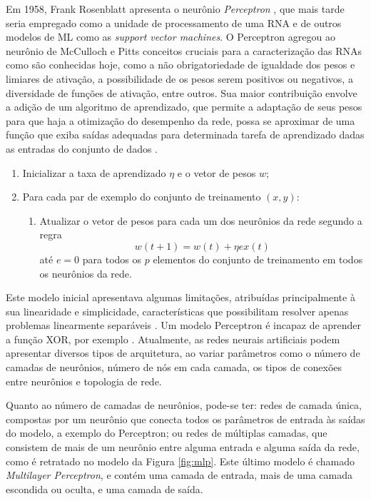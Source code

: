 Em 1958, Frank Rosenblatt apresenta o neurônio \emph{Perceptron} \cite{rosenblatt1958perceptron}, que mais tarde seria empregado como a unidade de processamento de uma RNA e de outros modelos de ML como as \emph{support vector machines}. O Perceptron agregou ao neurônio de McCulloch e Pitts conceitos cruciais para a caracterização das RNAs como são conhecidas hoje, como a não obrigatoriedade de igualdade dos pesos e limiares de ativação, a possibilidade de os pesos serem positivos ou negativos, a diversidade de funções de ativação, entre outros. Sua maior contribuição envolve a adição de um algoritmo de aprendizado, que permite a adaptação de seus pesos para que haja a otimização do desempenho da rede, possa se aproximar de uma função que exiba saídas adequadas para determinada tarefa de aprendizado dadas as entradas do conjunto de dados \cite{braga2000redes}.

\begin{enumerate}
	\item Inicializar a taxa de aprendizado $\eta$ e o vetor de pesos $w$;
	\item Para cada par de exemplo do conjunto de treinamento $(x, y)$:
	\begin{enumerate}
		\item Atualizar o vetor de pesos para cada um dos neurônios da rede segundo a regra
		\begin{equation}\label{eq:regra_aprendizado}
			w(t+1) = w(t) + \eta e x(t)
		\end{equation}
		até $e = 0$ para todos os $p$ elementos do conjunto de treinamento em todos os neurônios da rede.
	\end{enumerate}
\end{enumerate}

Este modelo inicial apresentava algumas limitações, atribuídas principalmente à sua linearidade e simplicidade, características que possibilitam resolver apenas problemas linearmente separáveis \cite{braga2000redes}. Um modelo Perceptron é incapaz de aprender a função XOR, por exemplo \cite{goodfellow2016deep}. Atualmente, as redes neurais artificiais podem apresentar diversos tipos de arquitetura, ao variar parâmetros como o número de camadas de neurônios, número de nós em cada camada, os tipos de conexões entre neurônios e topologia de rede.

Quanto ao número de camadas de neurônios, pode-se ter: redes de camada única, compostas por um neurônio que conecta todos os parâmetros de entrada às saídas do modelo, a exemplo do Perceptron; ou redes de múltiplas camadas, que consistem de mais de um neurônio entre alguma entrada e alguma saída da rede, como é retratado no modelo da Figura \ref{fig:mlp}. Este último modelo é chamado \emph{Multilayer Perceptron}, e contém uma camada de entrada, mais de uma camada escondida ou oculta, e uma camada de saída.

